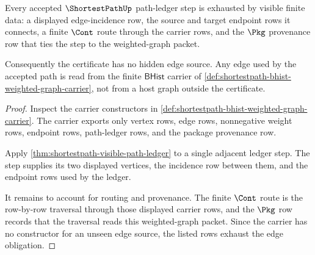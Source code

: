 \begin{theorem}
\label{thm:shortestpath-finite-edge-exhaustion}
Every accepted $\ShortestPathUp$ path-ledger step is exhausted by visible
finite data: a displayed edge-incidence row, the source and target endpoint
rows it connects, a finite $\Cont$ route through the carrier rows, and the
$\Pkg$ provenance row that ties the step to the weighted-graph packet.

Consequently the certificate has no hidden edge source. Any edge used by the
accepted path is read from the finite $\mathsf{BHist}$ carrier of
\autoref{def:shortestpath-bhist-weighted-graph-carrier}, not from a host graph
outside the certificate.
\end{theorem}
\begin{proof}
Inspect the carrier constructors in
\autoref{def:shortestpath-bhist-weighted-graph-carrier}. The carrier exports
only vertex rows, edge rows, nonnegative weight rows, endpoint rows,
path-ledger rows, and the package provenance row.

Apply \autoref{thm:shortestpath-visible-path-ledger} to a single adjacent
ledger step. The step supplies its two displayed vertices, the incidence row
between them, and the endpoint rows used by the ledger.

It remains to account for routing and provenance. The finite $\Cont$ route is
the row-by-row traversal through those displayed carrier rows, and the $\Pkg$
row records that the traversal reads this weighted-graph packet. Since the
carrier has no constructor for an unseen edge source, the listed rows exhaust
the edge obligation.
\end{proof}

